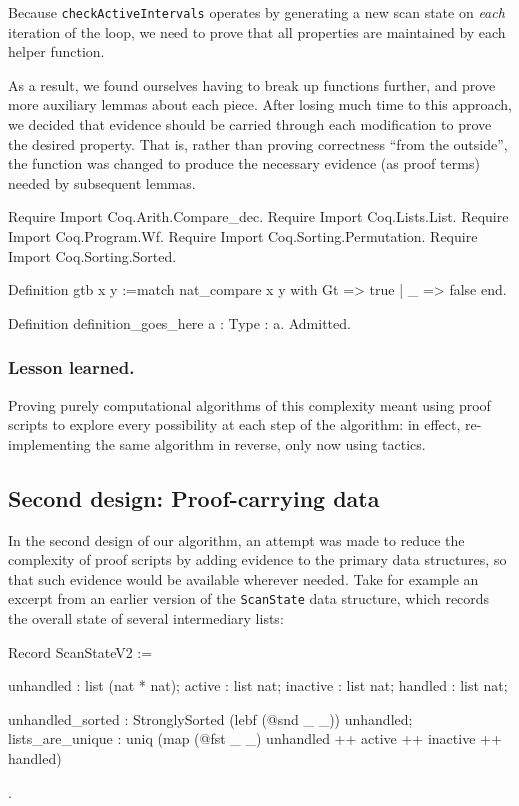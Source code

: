 \documentclass{llncs}
\begin{document}
Because \texttt{checkActiveIntervals} operates by generating a new scan state
on \emph{each} iteration of the loop, we need to prove that all properties are
maintained by each helper function.

As a result, we found ourselves having to break up functions further, and
prove more auxiliary lemmas about each piece.  After losing much time to this
approach, we decided that evidence should be carried through each modification
to prove the desired property.  That is, rather than proving correctness
``from the outside'', the function was changed to produce the necessary
evidence (as proof terms) needed by subsequent lemmas.

\begin{coq_eval}
Require Import Coq.Arith.Compare_dec.
Require Import Coq.Lists.List.
Require Import Coq.Program.Wf.
Require Import Coq.Sorting.Permutation.
Require Import Coq.Sorting.Sorted.

Definition gtb x y :=match nat_compare x y with Gt => true | _ => false end.

Definition definition_goes_here {a : Type} : a. Admitted.
\end{coq_eval}

\subsubsection*{Lesson learned.}

Proving purely computational algorithms of this complexity meant using proof
scripts to explore every possibility at each step of the algorithm: in effect,
re-implementing the same algorithm in reverse, only now using tactics.

\subsection{Second design: Proof-carrying data}
\label{sec:depinduct}

In the second design of our algorithm, an attempt was made to reduce the
complexity of proof scripts by adding evidence to the primary data structures,
so that such evidence would be available wherever needed.  Take for example an
excerpt from an earlier version of the \texttt{ScanState} data structure,
which records the overall state of several intermediary lists:

\begin{coq_example*}
Record ScanStateV2 := {
    unhandled : list (nat * nat);
    active    : list nat;
    inactive  : list nat;
    handled   : list nat;

    unhandled_sorted : StronglySorted (lebf (@snd _ _)) unhandled;
    lists_are_unique : uniq (map (@fst _ _) unhandled ++ active ++
                             inactive ++ handled)
}.
\end{coq_example*}
\end{document}
